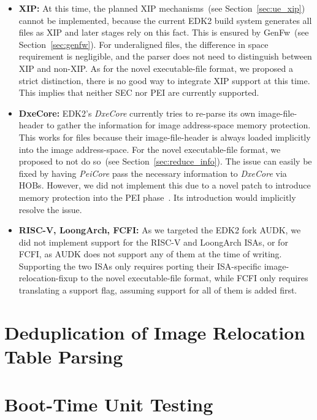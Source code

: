 \begin{itemize}
  \item \textbf{\gls{XIP}:} At this time, the planned \gls{XIP} mechanisms~(see Section~\ref{sec:ue_xip}) cannot be implemented, because the current \gls{EDK2} build system generates all  files as \gls{XIP} and later stages rely on this fact. This is ensured by GenFw~(see Section~\ref{sec:genfw}). For underaligned  files, the difference in space requirement is negligible, and the parser does not need to distinguish between \gls{XIP} and non-\gls{XIP}. As for the novel \gls{executable-file} format, we proposed a strict distinction, there is no good way to integrate \gls{XIP} support at this time. This implies that neither \gls{SEC} nor \gls{PEI} are currently supported.
  \item \textbf{DxeCore:} \Gls{EDK2}'s \textit{DxeCore} currently tries to re-parse its own \gls{image-file-header} to gather the information for \gls{image} \gls{address-space} memory protection. This works for  files because their \gls{image-file-header} is always loaded implicitly into the \gls{image} \gls{address-space}. For the novel \gls{executable-file} format, we proposed to not do so~(see Section~\ref{sec:reduce_info}). The issue can easily be fixed by having \textit{PeiCore} pass the necessary information to \textit{DxeCore} via \glspl{HOB}. However, we did not implement this due to a novel patch to introduce memory protection into the \gls{PEI} phase~\cite{pei-mem-perms}. Its introduction would implicitly resolve the issue.
  \item \textbf{RISC-V, LoongArch, \gls{FCFI}:} As we targeted the \gls{EDK2} fork \gls{AUDK}, we did not implement support for the RISC-V and LoongArch \glspl{ISA}, or for \gls{FCFI}, as \gls{AUDK} does not support any of them at the time of writing. Supporting the two \glspl{ISA} only requires porting their \gls{ISA}-specific \gls{image-relocation-fixup} to the novel \gls{executable-file} format, while \gls{FCFI} only requires translating a support flag, assuming  support for all of them is added first.
\end{itemize}

\section{Deduplication of Image Relocation Table Parsing}
\label{sec:reloc_dedupe}

\section{Boot-Time Unit Testing}

